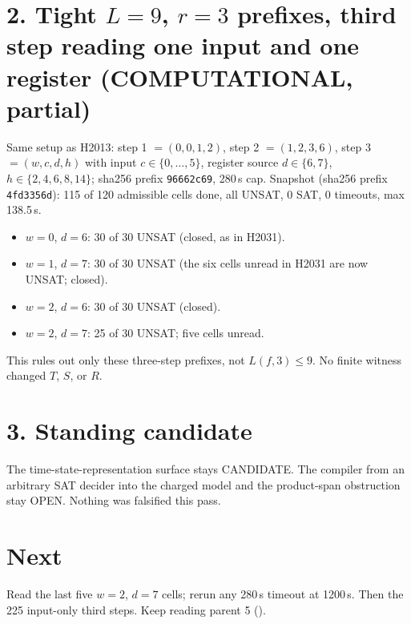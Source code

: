 \documentclass[11pt]{article}
\begin{document}
\section*{2. Tight $L=9$, $r=3$ prefixes, third step reading one input and one register (COMPUTATIONAL, partial)}
Same setup as H2013: step 1 $=(0,0,1,2)$, step 2 $=(1,2,3,6)$, step 3 $=(w,c,d,h)$ with input $c\in\{0,\dots,5\}$, register source $d\in\{6,7\}$, $h\in\{2,4,6,8,14\}$;  sha256 prefix \texttt{96662c69}, 280\,s cap. Snapshot  (sha256 prefix \texttt{4fd3356d}): 115 of 120 admissible cells done, all UNSAT, 0 SAT, 0 timeouts, max 138.5\,s.
\begin{itemize}
\item $w=0$, $d=6$: 30 of 30 UNSAT (closed, as in H2031).
\item $w=1$, $d=7$: 30 of 30 UNSAT (the six cells unread in H2031 are now UNSAT; closed).
\item $w=2$, $d=6$: 30 of 30 UNSAT (closed).
\item $w=2$, $d=7$: 25 of 30 UNSAT; five cells unread.
\end{itemize}
This rules out only these three-step prefixes, not $L(f,3)\le 9$. No finite witness changed $T$, $S$, or $R$.

\section*{3. Standing candidate}
The time-state-representation surface stays CANDIDATE. The compiler from an arbitrary SAT decider into the charged model and the product-span obstruction stay OPEN. Nothing was falsified this pass.

\section*{Next}
Read the last five $w=2$, $d=7$ cells; rerun any 280\,s timeout at 1200\,s. Then the 225 input-only third steps. Keep reading parent 5 ().
\end{document}
